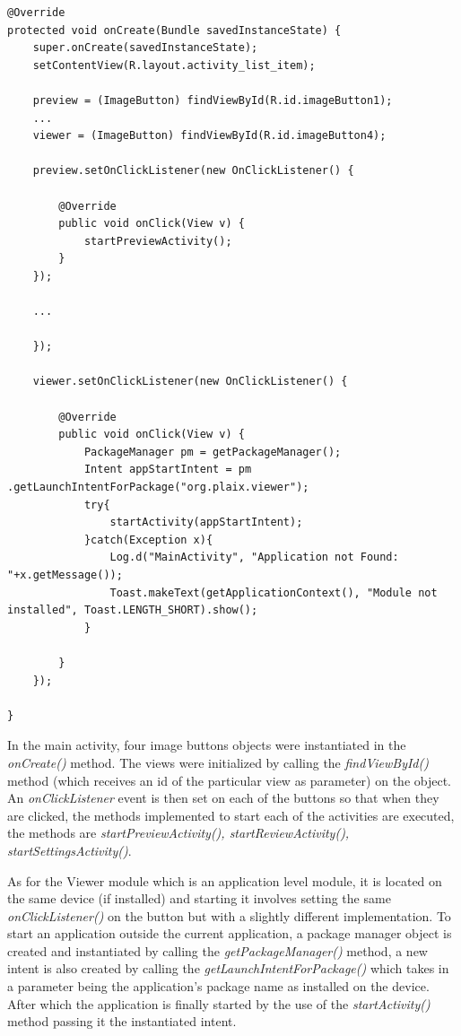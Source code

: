 \begin{lstlisting}[label=main-oncreate,caption=Implementation of main activity onCreate method] 
@Override
protected void onCreate(Bundle savedInstanceState) {
	super.onCreate(savedInstanceState);
	setContentView(R.layout.activity_list_item);

	preview = (ImageButton) findViewById(R.id.imageButton1);
	...
	viewer = (ImageButton) findViewById(R.id.imageButton4);

	preview.setOnClickListener(new OnClickListener() {

		@Override
		public void onClick(View v) {
			startPreviewActivity();
		}
	});

	...

	});

	viewer.setOnClickListener(new OnClickListener() {

		@Override
		public void onClick(View v) {
			PackageManager pm = getPackageManager();
			Intent appStartIntent = pm	.getLaunchIntentForPackage("org.plaix.viewer");
			try{
				startActivity(appStartIntent);
			}catch(Exception x){
				Log.d("MainActivity", "Application not Found: "+x.getMessage());
				Toast.makeText(getApplicationContext(), "Module not installed", Toast.LENGTH_SHORT).show();
			}

		}
	});

}
\end{lstlisting} 

In the main activity, four image buttons objects were instantiated in the {\it onCreate()} method. The views were initialized by calling the {\it findViewById()} method (which receives an id of the particular view as parameter) on the object. An {\it onClickListener} event is then set on each of the buttons so that when they are clicked, the methods implemented to start each of the activities are executed, the methods are {\it startPreviewActivity(), startReviewActivity(), startSettingsActivity()}.

As for the Viewer module which is an application level module, it is located on the same device (if installed) and starting it involves setting the same {\it onClickListener()} on the button but with a slightly different implementation. To start an application outside the current application, a package manager object is created and instantiated by calling the {\it getPackageManager()} method, a new intent is also created by calling the {\it getLaunchIntentForPackage()} which takes in a parameter being the application's package name as installed on the device. After which the application is finally started by the use of the {\it startActivity()} method passing it the instantiated intent.

